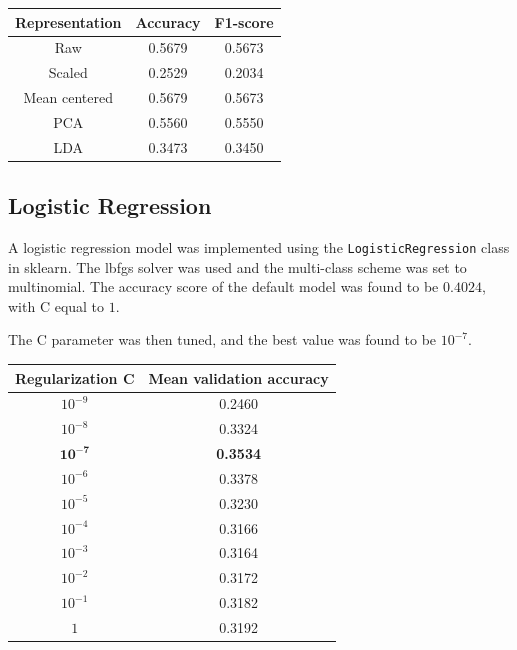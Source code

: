 \documentclass[12pt]{article}
\begin{document}
\begin{center}
  \begin{tabular}{|c|c|c|}
    \hline
    Representation & Accuracy & F1-score \\
    \hline
    Raw & 0.5679 & 0.5673\\
    Scaled & 0.2529 & 0.2034\\
    Mean centered & 0.5679 & 0.5673\\
    PCA & 0.5560 & 0.5550\\
    LDA & 0.3473 & 0.3450\\
    \hline
  \end{tabular}
\end{center}

\subsection*{Logistic Regression}

A logistic regression model was implemented using the \texttt{LogisticRegression} class in sklearn. The lbfgs solver was used and the multi-class scheme was set to multinomial. The accuracy score of the default model was found to be $0.4024$, with C equal to $1$.

The C parameter was then tuned, and the best value was found to be $10^{-7}$.

\begin{center}
\begin{tabular}{|c|c|}
 \hline
 Regularization C& Mean validation accuracy \\
 \hline
  $10^{-9}$& 0.2460\\
 $10^{-8}$ & 0.3324\\
 $\mathbf{10^{-7}}$ & \textbf{0.3534}\\
 $10^{-6}$ & 0.3378\\
 $10^{-5}$ & 0.3230\\
 $10^{-4}$ & 0.3166\\
 $10^{-3}$ & 0.3164\\
 $10^{-2}$ & 0.3172\\
 $10^{-1}$ & 0.3182\\
 $1$ & 0.3192\\
 \hline
\end{tabular}
\end{center}
\end{document}
